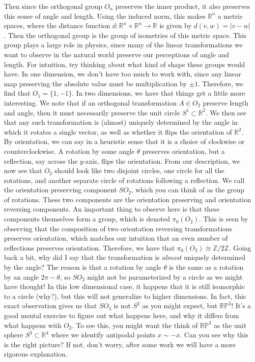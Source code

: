 \documentclass{article}
\newcommand{\R}{\mathbb{R}}
\newcommand{\Z}{\mathbb{Z}}
\begin{document}
Then since the orthogonal group $O_n$ preserves the inner product, it also preserves this sense of angle and length. Using the induced norm, this makes $\R^n$ a metric spaces, where the distance function $d : \R^n \times \R^n \to \R$ is given by $d(v,w) = |v - w|$. Then the orthogonal group is the group of isometries of this metric space. This group plays a large role in physics, since many of the linear transformations we want to observe in the natural world preserve our perceptions of angle and length. For intuition, try thinking about what kind of shape these groups would have. In one dimension, we don't have too much to work with, since any linear map preserving the absolute value must be multiplication by $\pm 1$. Therefore, we find that $O_1 = \{1, -1\}$. In two dimensions, we have that things get a little more interesting. We note that if an orthogonal transformation $A \in O_2$ preserve length and angle, then it must necessarily preserve the unit circle $S^1 \subset \R^2$. We then see that any such transformation is (almost) uniquely determined by the angle in which it rotates a single vector, as well as whether it flips the orientation of $\R^2$. By orientation, we can say in a heuristic sense that it is a choice of clockwise or counterclockwise. A rotation by some angle $\theta$ preserves orientation, but a reflection, say across the $y$-axis, flips the orientation. From our description, we now see that $O_2$ should look like two disjoint circles, one circle for all the rotations, and another separate circle of rotations following a reflection. We call the orientation preserving component $SO_2$, which you can think of as the group of rotations. These two components are the orientation preserving and orientation reversing components. An important thing to observe here is that these components themselves form a group, which is denoted $\pi_0(O_2)$. This is seen by observing that the composition of two orientation reversing transformations preserves orientation, which matches our intuition that an even number of reflections preserves orientation. Therefore, we have that $\pi_0(O_2) \cong \Z / 2\Z$. Going back a bit, why did I say that the transformation is \emph{almost} uniquely determined by the angle? The reason is that a rotation by angle $\theta$ is the same as a rotation by an angle $2\pi - \theta$, so $SO_2$ might not be parameterized by a circle as we might have thought! In this low dimensional case, it happens that it is still isomorphic to a circle (why?), but this will not generalize to higher dimensions. In fact, this exact observation gives us that $SO_3$ is not $S^2$ as you might expect, but $\mathbb{RP}^3$! It's a good mental exercise to figure out what happens here, and why it differs from what happens with $O_2$. To see this, you might want the think of $\mathbb{RP}^3$ as the unit sphere $S^3 \subset \R^4$ where we identify antipodal points $x \sim -x$. Can you see why this is the right picture? If not, don't worry, after some work we will have a more rigorous explanation.
\end{document}
